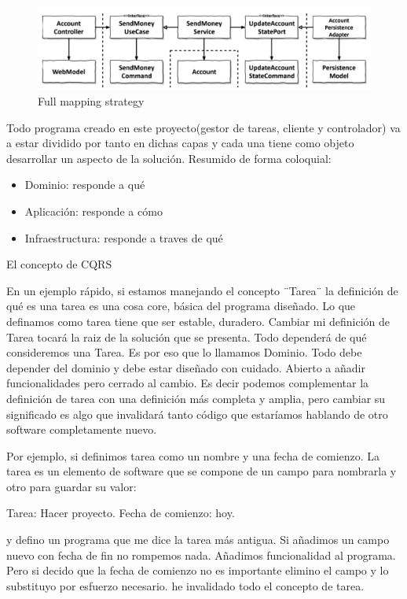 \begin{figure}[H]
    \centering
    \includegraphics[height=0.1\textheight]{./part/Ejecucion/Seguimiento/CreateTaskUseCase/img/fullmapping}
    \caption{Full mapping strategy \cite{TomHombergs2019GYHD}}\label{fig:fullmapping}
\end{figure}


Todo programa creado en este proyecto(gestor de tareas, cliente y controlador) va a estar dividido por tanto en dichas capas y cada una tiene como objeto desarrollar un aspecto de la solución. Resumido de forma coloquial:

\begin{itemize}
    \item Dominio: responde a qué
    \item Aplicación: responde a cómo
    \item Infraestructura: responde a traves de qué
\end{itemize}

El concepto de CQRS



En un ejemplo rápido, si estamos manejando el concepto ¨Tarea¨ la definición de qué es una tarea es una cosa core, básica del programa diseñado. Lo que definamos como tarea tiene que ser estable, duradero. Cambiar mi definición de Tarea tocará la raiz de la solución que se presenta. Todo dependerá de qué consideremos una Tarea. Es por eso que lo llamamos Dominio. Todo debe depender del dominio y debe estar diseñado con cuidado. Abierto a añadir funcionalidades pero cerrado al cambio. Es decir podemos complementar la definición de tarea con una definición más completa y amplia, pero cambiar su significado es algo que invalidará tanto código que estaríamos hablando de otro software completamente nuevo.

Por ejemplo, si definimos tarea como un nombre y una fecha de comienzo. La tarea es un elemento de software que se compone de un campo para nombrarla y otro para guardar su valor:

Tarea: Hacer proyecto.
Fecha de comienzo: hoy.

y defino un programa que me dice la tarea más antigua. Si añadimos un campo nuevo con fecha de fin no rompemos nada. Añadimos funcionalidad al programa. Pero si decido que la fecha de comienzo no es importante elimino el campo y lo substituyo por esfuerzo necesario. he invalidado todo el concepto de tarea.

